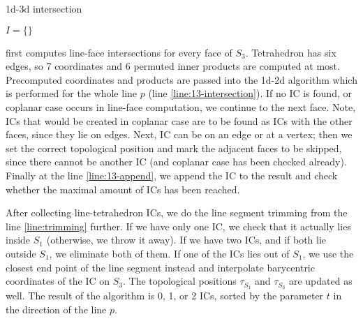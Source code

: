\begin{algorithm}
  \caption{1d-3d intersection}
  \label{algo:13d}

  \DontPrintSemicolon
  $I=\{\}$\; 
   \label{line:trimming}
\end{algorithm}
 first computes line-face intersections for every face of $S_3$.
Tetrahedron has six edges, so 7 \plucker coordinates and 6 permuted inner products are computed at most. 
Precomputed coordinates and products are passed into the 1d-2d algorithm which is performed for the whole 
line $p$ (line \ref{line:13-intersection}).
If no IC is found, or coplanar case occurs in line-face computation, we continue to the next face. Note, ICs that would 
be created in coplanar case are to be found as ICs with the other faces, since they lie on edges.
Next, IC can be on an edge or at a vertex; then we set the correct topological position and mark the adjacent faces
to be skipped, since there cannot be another IC (and coplanar case has been checked already).
Finally at the line \ref{line:13-append}, we append the IC to the result and check whether the maximal amount of 
ICs has been reached.

After collecting line-tetrahedron ICs,
we do the line segment trimming from the line \ref{line:trimming} further. 
If we have only one IC, we check that it actually lies inside $S_1$ (otherwise, we throw it away).
If we have two ICs, and if both lie outside $S_1$, we eliminate both of them. 
If one of the ICs lies out of $S_1$,
we use the closest end point of the line segment instead and interpolate barycentric coordinates of the IC on $S_3$. The topological positions $\tau_{S_1}$ and $\tau_{S_3}$ are updated as well.
The result of the algorithm is 0, 1, or 2 ICs, sorted by the parameter $t$ in the direction of the line $p$.



